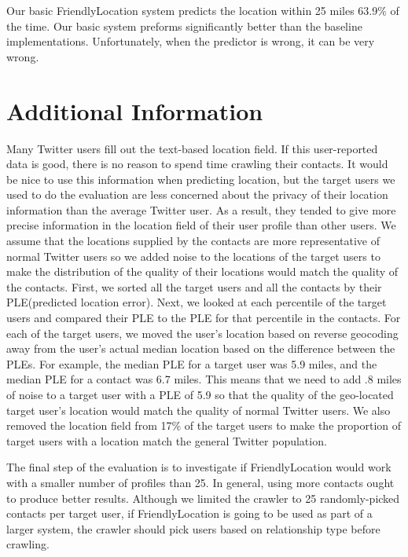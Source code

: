 Our basic FriendlyLocation system predicts the location within 25 miles 63.9\% of
the time.
%
Our basic system preforms significantly better than the baseline implementations.
%
Unfortunately, when the predictor is wrong, it can be very wrong. 
%
%


\section{Additional Information}
Many Twitter users fill out the text-based location field.
%
If this user-reported data is good, there is no reason to spend time
crawling their contacts.
%
It would be nice to use this information when predicting location, but
the target users we used to do the evaluation are less concerned about
the privacy of their location information than the average Twitter user.
%
As a result, they tended to give more precise information in the location
field of their user profile than other users.
%
We assume that the locations supplied by the contacts are more
representative of normal Twitter users so we added noise to the locations
of the target users to make the distribution of the quality of their
locations would match the quality of the contacts.
%
First, we sorted all the target users and all the contacts by their
PLE(predicted location error).
%
Next, we looked at each percentile of the target users and compared
their PLE to the PLE for that percentile in the contacts.
%
For each of the target users, we moved the user's location based on
reverse geocoding away from the user's actual median location based on the
difference between the PLEs.
%
For example, the median PLE for a target user was 5.9 miles, and the median
PLE for a contact was 6.7 miles.
%
This means that we need to add .8 miles of noise to a target user
with a PLE of 5.9 so that the quality of the geo-located target user's location
would match the quality of normal Twitter users.
%
We also removed the location field from 17\% of the target users to
make the proportion of target users with a location match the general
Twitter population.


The final step of the evaluation is to investigate if FriendlyLocation would
work with a smaller number of profiles than 25.
%
%
In general, using more contacts ought to produce better results.
%
Although we limited the crawler to 25 randomly-picked contacts per target
user, if FriendlyLocation is going to be used as part of a larger system, the
crawler should pick users based on relationship type before crawling.

